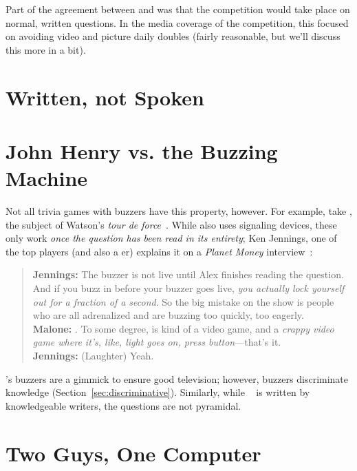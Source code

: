Part of the agreement between \jeopardy{} and  was that the competition would take place on normal, written questions.
%
In the media coverage of the competition, this focused on avoiding video and picture daily doubles (fairly reasonable, but we'll discuss this more in a bit).
%


\section{Written, not Spoken}

\section{John Henry vs. the Buzzing Machine}

Not all trivia games with buzzers have this property, however.
For example, take \jeopardy{}, the subject of Watson's \textit{tour de force}~\cite{ferruci-10}.
While \jeopardy{} also uses signaling devices, these only work \emph{once the question has been read in its entirety}; Ken Jennings, one of the top \jeopardy{} players (and also a \qb{}er) explains it on a \textit{Planet Money} interview~\cite{malone-19}:
\begin{quote}
{\bf Jennings:} The buzzer is
    not live until Alex finishes reading the question. And if you buzz
    in before your buzzer goes live, \emph{you actually lock yourself out
    for a fraction of a second}. So the big mistake on the show is
    people who are all adrenalized and are buzzing too quickly, too
    eagerly. \\
{\bf Malone:} . To some degree, \jeopardy{} is kind of a video game, and a \emph{crappy video game where it's, like, light goes on, press button}---that's it. \\
{\bf Jennings:} (Laughter) Yeah. \\
\end{quote}
\jeopardy{}'s buzzers are a gimmick to ensure good television; however, \qb{} buzzers discriminate knowledge (Section~\ref{sec:discriminative}).
Similarly, while \triviaqa{}~\cite{joshi-17} is written by knowledgeable writers, the questions are not pyramidal.

\section{Two Guys, One Computer}


\section{}
